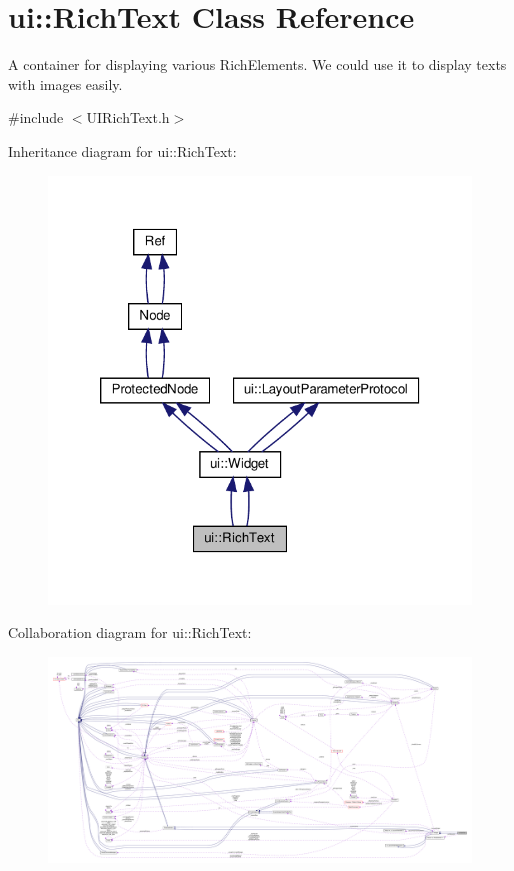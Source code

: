 \hypertarget{classui_1_1RichText}{}\section{ui\+:\+:Rich\+Text Class Reference}
\label{classui_1_1RichText}


A container for displaying various Rich\+Elements. We could use it to display texts with images easily.  




{\ttfamily \#include $<$U\+I\+Rich\+Text.\+h$>$}



Inheritance diagram for ui\+:\+:Rich\+Text\+:
\nopagebreak
\begin{figure}[H]
\begin{center}
\leavevmode
\includegraphics[width=320pt]{classui_1_1RichText__inherit__graph}
\end{center}
\end{figure}


Collaboration diagram for ui\+:\+:Rich\+Text\+:
\nopagebreak
\begin{figure}[H]
\begin{center}
\leavevmode
\includegraphics[width=350pt]{classui_1_1RichText__coll__graph}
\end{center}
\end{figure}
